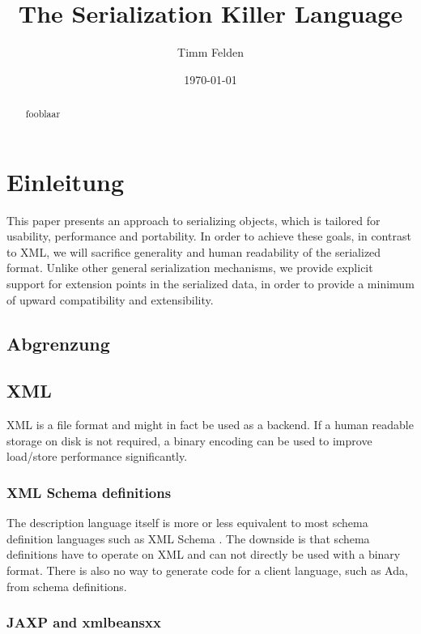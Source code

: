 \documentclass[a4paper,10pt]{article}
\title{The Serialization Killer Language}
\author{Timm Felden}
\date{\today}
\begin{document}
\maketitle

\begin{abstract}
 fooblaar
\end{abstract}

\section{Einleitung}

This paper presents an approach to serializing objects, which is tailored for usability, performance and portability. In order to achieve these goals, in contrast to XML, we will sacrifice generality and human readability of the serialized format. Unlike other general serialization mechanisms, we provide explicit support for extension points in the serialized data, in order to provide a minimum of upward compatibility and extensibility.

\subsection{Abgrenzung}

\subsection*{XML}

XML is a file format and might in fact be used as a backend. If a human readable storage on disk is not required, a binary encoding can be used to improve load/store performance significantly. 


\subsubsection*{XML Schema definitions}

The description language itself is more or less equivalent to most schema definition languages such as XML Schema . The downside is that schema definitions have to operate on XML and can not directly be used with a binary format. There is also
no way to generate code for a client language, such as Ada, from schema definitions.

\subsubsection*{JAXP and xmlbeansxx}
\end{document}

